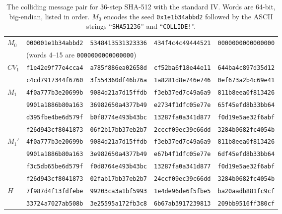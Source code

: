\documentclass[11pt]{article}
\newcommand{\hx}[1]{\texttt{#1}}
\begin{document}
\begin{table}[t]
\centering
\caption{The colliding message pair for 36-step SHA-512 with the standard IV. Words are 64-bit, big-endian, listed in order. $M_0$ encodes the seed \hx{0x1e1b34abbd2} followed by the ASCII strings ``\hx{SHA51236}'' and ``\hx{COLLIDE!}''.}
\label{tab:pair}
\small
\setlength{\tabcolsep}{4pt}
\begin{tabular}{l@{\quad}llll}
\toprule
$M_0$ & \hx{000001e1b34abbd2} & \hx{5348413531323336} & \hx{434f4c4c49444521} & \hx{0000000000000000} \\
      & \multicolumn{4}{l}{(words 4--15 are \hx{0000000000000000})} \\
\midrule
$\mathit{CV}_1$ & \hx{f1e42e9f77e4cca4} & \hx{a785f886ea02658d} & \hx{cf52ba6f18e44e11} & \hx{644ba4c897d35d12} \\
                & \hx{c4cd7917344f6760} & \hx{3f554360df46b76a} & \hx{1a8281d8e746e746} & \hx{0ef673a2b4c69e41} \\
\midrule
$M_1$ & \hx{4f0a777b3e20699b} & \hx{9084d21a7d15ffdb} & \hx{f3eb37ed7c49a6a9} & \hx{811b8eea0f813426} \\
      & \hx{9901a1886b80a163} & \hx{36982650a4377b49} & \hx{e2734f1dfc05e77e} & \hx{65f45efd8b33bb64} \\
      & \hx{d395fbe4be6d579f} & \hx{b0f8774e493b43bc} & \hx{13287fa0a341d877} & \hx{f0d19e5ae32f6abf} \\
      & \hx{f26d943cf8041873} & \hx{06f2b17bb37eb2b7} & \hx{2cccf09ec39c66dd} & \hx{3284b0682fc4054b} \\
\midrule
$M_1'$ & \hx{4f0a777b3e20699b} & \hx{9084d21a7d15ffdb} & \hx{f3eb37ed7c49a6a9} & \hx{811b8eea0f813426} \\
       & \hx{9901a1886b80a163} & \hx{3e982650a4377b49} & \hx{e67b4f1dfc05e77e} & \hx{6df45efd8b33bb64} \\
       & \hx{f3c5db65be6d579f} & \hx{f0d8764e493b43bc} & \hx{13287fa0a341d877} & \hx{f0d19e5ae32f6abf} \\
       & \hx{f26d943cf8041873} & \hx{02fab17bb37eb2b7} & \hx{24ccf09ec39c66dd} & \hx{3284b0682fc4054b} \\
\midrule
$H$ & \hx{7f987d4f13fdfebe} & \hx{99203ca3a1bf5993} & \hx{1e4de96de6f5fbe5} & \hx{ba20aadb881fc9cf} \\
    & \hx{33724a7027ab508b} & \hx{3e25595a172fb3c8} & \hx{6b67ab3917239813} & \hx{209bb9516ff380cf} \\
\bottomrule
\end{tabular}


\end{table}
\end{document}
